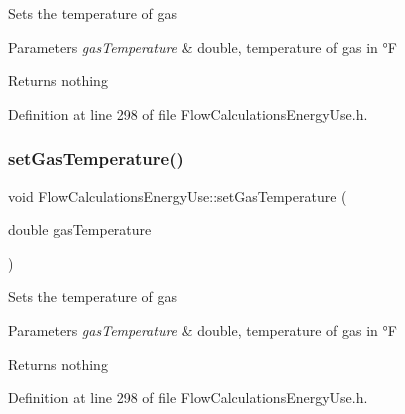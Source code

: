 Sets the temperature of gas


\begin{DoxyParams}{Parameters}
{\em gas\+Temperature} & double, temperature of gas in °F\\
\hline
\end{DoxyParams}
\begin{DoxyReturn}{Returns}
nothing 
\end{DoxyReturn}


Definition at line 298 of file Flow\+Calculations\+Energy\+Use.\+h.

\mbox{\label{class_flow_calculations_energy_use_a80db5465d8a0354da31a7f90c759ea1f}} 
\subsubsection{\texorpdfstring{set\+Gas\+Temperature()}{setGasTemperature()}\hspace{0.1cm}{\footnotesize\ttfamily [3/3]}}
{\footnotesize\ttfamily void Flow\+Calculations\+Energy\+Use\+::set\+Gas\+Temperature (\begin{DoxyParamCaption}\item[{double}]{gas\+Temperature }\end{DoxyParamCaption})\hspace{0.3cm}{\ttfamily [inline]}}

Sets the temperature of gas


\begin{DoxyParams}{Parameters}
{\em gas\+Temperature} & double, temperature of gas in °F\\
\hline
\end{DoxyParams}
\begin{DoxyReturn}{Returns}
nothing 
\end{DoxyReturn}


Definition at line 298 of file Flow\+Calculations\+Energy\+Use.\+h.

\mbox{\label{class_flow_calculations_energy_use_a01b38762426c50e6ab22aefd674f30df}} 
